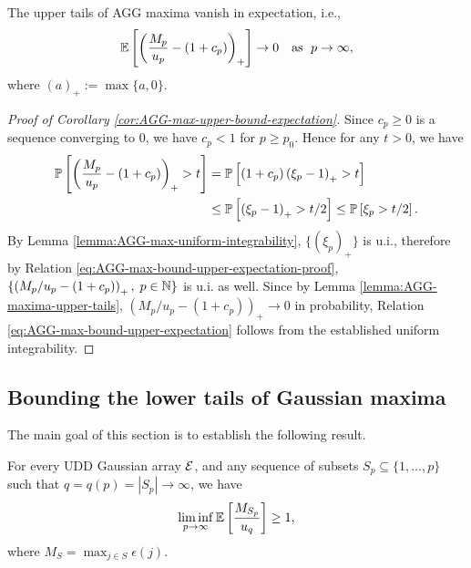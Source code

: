 \begin{corollary} \label{cor:AGG-max-upper-bound-expectation}
The upper tails of AGG maxima vanish in expectation, i.e.,
    \begin{equation} \label{eq:AGG-max-bound-upper-expectation}
    \E\left[\left(\frac{M_p}{u_p} - (1+c_p)\right)_+\right]
    \to 0 \quad\text{as }\; p\to\infty,
\end{equation}
where $(a)_+ := \max\{a,0\}$.
\end{corollary}

\begin{proof}[Proof of Corollary \ref{cor:AGG-max-upper-bound-expectation}]
Since $c_p\ge0$ is a sequence converging to 0, we have $c_p < 1$ for $p \ge p_0$. Hence for any $t>0$, we have
\begin{align}
    \P\left[\left(\frac{M_p}{u_p} - (1+c_p)\right)_+ > t\right] 
    &= \P\left[(1+c_p)\left(\xi_p-1\right)_+ > t\right] \nonumber \\
    &\le \P\left[\left(\xi_p-1\right)_+ > t/2\right] 
    \le \P\left[\xi_p > t/2 \right]. \label{eq:AGG-max-bound-upper-expectation-proof}
\end{align}
By Lemma \ref{lemma:AGG-max-uniform-integrability}, $\{\left(\xi_p\right)_+\}$ is u.i., therefore by Relation \eqref{eq:AGG-max-bound-upper-expectation-proof}, $\{\left(M_p/u_p - (1+c_p)\right)_+,\;p\in\N\}$ is u.i. as well.
Since by Lemma \ref{lemma:AGG-maxima-upper-tails}, $\left(M_p/u_p - (1+c_p)\right)_+\to 0$ in probability, Relation \eqref{eq:AGG-max-bound-upper-expectation} follows from the established uniform integrability.
\end{proof}


\subsection{Bounding the lower tails of Gaussian maxima}
\label{subsec:bounding-lower-tails-of-maxima}

The main goal of this section is to establish the following result. 

\begin{proposition} \label{prop:Gaussian-maxima-expectation-lower-bound}
For every UDD Gaussian array $\cal E$, and any sequence of subsets
$S_p\subseteq\{1,\ldots,p\}$ such that $q = q(p) = |S_p|\to \infty$, we have
\begin{equation} \label{eq:AGG-max-bound-expectation}
    \liminf_{p\to\infty} \E\left[\frac{M_{S_p}}{u_q}\right] \ge 1,
\end{equation}
where $M_S = \max_{j\in S}\epsilon(j)$.
\end{proposition}

